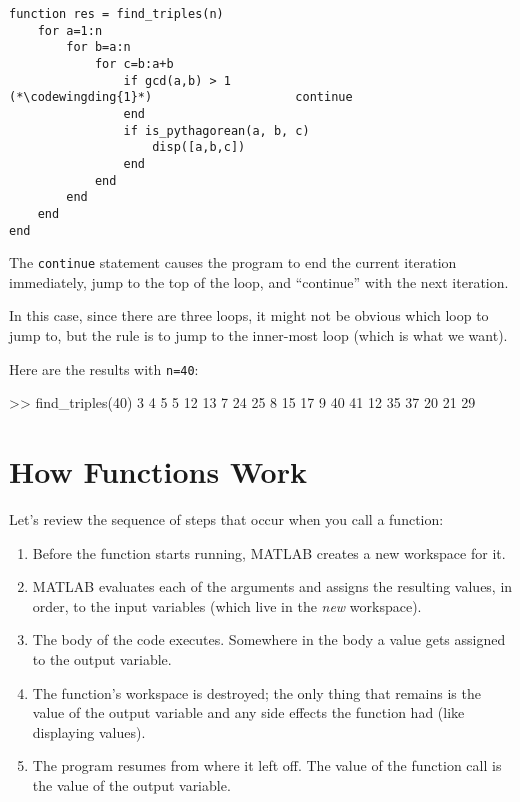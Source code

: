 \begin{lstlisting}[caption={Our final Pythagorean triples function}, label={lst:triples_function}] 
function res = find_triples(n)
    for a=1:n
        for b=a:n
            for c=b:a+b
                if gcd(a,b) > 1
(*\codewingding{1}*)	                continue
                end
                if is_pythagorean(a, b, c)
                    disp([a,b,c])
                end
            end
        end
    end
end
\end{lstlisting}

The {\tt continue} statement  causes the program to end the current iteration
immediately, jump to the top of the loop, and ``continue'' with the next iteration.

In this case, since there are three loops, it might not be obvious which loop to jump to, but the rule is to jump to the inner-most loop (which is what we want).

Here are the results with {\tt n=40}:

\begin{code}
>> find_triples(40)
     3     4     5
     5    12    13
     7    24    25
     8    15    17
     9    40    41
    12    35    37
    20    21    29
\end{code}


\section{How Functions Work}

Let's review the sequence of steps that occur when you call a function:

\begin{enumerate}

\item Before the function starts running, MATLAB creates a new
workspace for it.

\item MATLAB evaluates each of the arguments and assigns
the resulting values, in order, to the input variables (which
live in the {\em new} workspace).

\item The body of the code executes.  Somewhere in the body
a value gets assigned to the output variable.

\item The function's workspace is destroyed; the only thing
that remains is the value of the output variable and any side
effects the function had (like displaying values).

\item The program resumes from where it left off.  The value
of the function call is the value of the output variable.

\end{enumerate}

